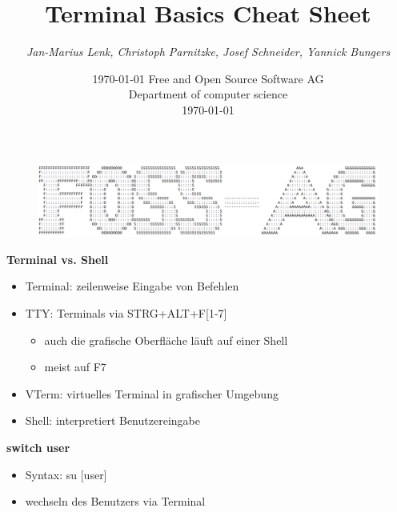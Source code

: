 \documentclass[12pt,utf8, 10pt]{article}
\newcommand\svthema{Terminal Basics Cheat Sheet}
\newcommand\svperson{Jan-Marius Lenk, Christoph Parnitzke, Josef Schneider, Yannick Bungers}
\newcommand\svdatum{\today}
\newcommand\lvinst{Free and Open Source Software AG\\ Department of computer science}
\begin{document}
\date{\today}
\title{ \textbf{\color{blue}\svthema} }
\author{ \textsl{\color{black}\svperson} }
\date{ \small \lvinst \\ \svdatum}


\begin{figure}
\includegraphics[scale=0.35]{foss-ag.png}
\end{figure}

\maketitle


\small
\textbf{Terminal vs. Shell}
\begin{itemize}
	\item Terminal: zeilenweise Eingabe von Befehlen
	\item TTY: Terminals via STRG+ALT+F[1-7]
	\begin{itemize}
		\item auch die grafische Oberfläche läuft auf einer Shell
		\item meist auf F7
	\end{itemize}
	\item VTerm: virtuelles Terminal in grafischer Umgebung
	\item Shell: interpretiert Benutzereingabe
\end{itemize}

\textbf{switch user}
\begin{itemize}
	\item Syntax: su [user]
	\item wechseln des Benutzers via Terminal
\end{itemize}
\end{document}
